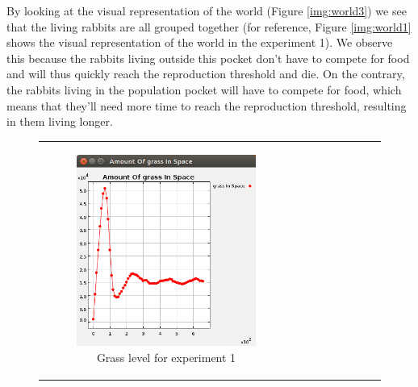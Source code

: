 \documentclass[11pt]{article}
\begin{document}
By looking at the visual representation of the world (Figure \ref{img:world3}) we see that the living rabbits are all grouped together (for reference, Figure \ref{img:world1} shows the visual representation of the world in the experiment 1). We observe this because the rabbits living outside this pocket don't have to compete for food and will thus quickly reach the reproduction threshold and die. On the contrary, the rabbits living in the population pocket will have to compete for food, which means that they'll need more time to reach the reproduction threshold, resulting in them living longer.

\begin{figure}
    \begin{tabular}{c c c}
         \begin{subfigure}[b]{0.3\textwidth}
        \includegraphics[width=\textwidth]{experiment/1/Grass.png}
        \caption{\label{img:grass1} Grass level for experiment 1}
    \end{subfigure} & 
    \begin{subfigure}[b]{0.3\textwidth}

\end{subfigure}
\end{tabular}
\end{figure}
\end{document}
